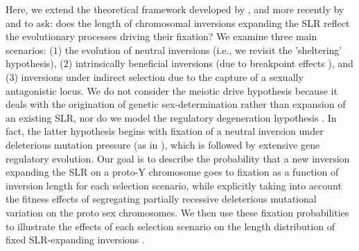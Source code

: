 \documentclass{article}[12pt]
\newcommand\hl[1]{%
  \bgroup
  \hskip0pt\color{blue!80!black}%
  #1%
  \egroup
}
\begin{document}
Here, we extend the theoretical framework developed by \citet{vanValenLevins1968, Santos1986}, and more recently by \citet{ConnallonOlito2021} and \citet{Olito-etal-2022} to ask: does the length of chromosomal inversions expanding the SLR reflect the evolutionary processes driving their fixation? We examine three main scenarios: ($1$) the evolution of neutral inversions (i.e., we revisit the 'sheltering' hypothesis), ($2$) intrinsically beneficial inversions (due to breakpoint effects \citealt{CorbettDetig2016}), and ($3$) inversions under indirect selection due to the capture of a sexually antagonistic locus. We do not consider the meiotic drive hypothesis \citep{UbedaPatten2010} because it deals with the origination of genetic sex-determination rather than expansion of an existing SLR, nor do we model the regulatory degeneration hypothesis \citep[see]{LenormandRoze2022}. In fact, the latter hypothesis begins with fixation of a neutral inversion under deleterious mutation pressure (as in \citealt{Olito-etal-2022,Jay2022}), which is followed by extensive gene regulatory evolution. Our goal is to describe the probability that a new inversion expanding the SLR on a proto-Y chromosome goes to fixation as a function of inversion length for each selection scenario, while explicitly taking into account the fitness effects of segregating partially recessive deleterious mutational variation on the proto sex chromosomes. We then use these fixation probabilities to illustrate the effects of each selection scenario on the length distribution of fixed SLR-expanding inversions \citep[after][]{vanValenLevins1968,Santos1986,ConnallonOlito2021}. 

\end{document}
